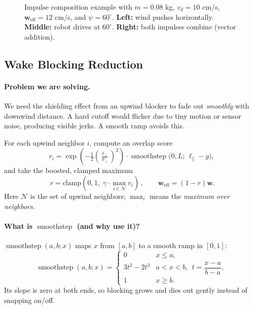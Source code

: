 \documentclass[11pt,a4paper]{article}
\DeclareMathOperator{\smoothstep}{smoothstep}
\newcommand{\vect}[1]{\mathbf{#1}}
\begin{document}
\begin{figure}[H]
  \caption{Impulse composition example with $m=0.08$ kg, $v_d=10$ cm/s, $\vect{w}_\text{eff}=12$ cm/s, and $\psi=60^\circ$.
  \textbf{Left:} wind pushes horizontally. \textbf{Middle:} robot drives at $60^\circ$. \textbf{Right:} both impulses combine (vector addition).}
\end{figure}

\subsection{Wake Blocking Reduction}
\label{sec:wake-blocking}

\paragraph{Problem we are solving.}
We need the shielding effect from an upwind blocker to fade out \emph{smoothly} with downwind distance. A hard cutoff would flicker
due to tiny motion or sensor noise, producing visible jerks. A smooth ramp avoids this.

For each upwind neighbor \(i\), compute an overlap score
\begin{equation}
  r_i = \exp\!\left(-\tfrac{1}{2}\left(\tfrac{\ell_\perp}{\sigma_\perp}\right)^2\right)
        \cdot \smoothstep\!\bigl(0, L;\, \ell_\parallel - g \bigr),
  \label{eq:ri}
\end{equation}
and take the boosted, clamped maximum
\[
  \boxed{\,r = \mathrm{clamp}\!\left(0,1,\;\gamma\cdot\max_{i\in\mathcal{N}} r_i\right)\,},\qquad
  \vect{w}_\text{eff}=(1-r)\vect{w}.
\]
Here \(\mathcal{N}\) is the set of upwind neighbors; \(\max_i\) means the \emph{maximum over neighbors}.

\paragraph{What is \(\smoothstep{}\) (and why use it)?}
\(\smoothstep(a,b;x)\) maps \(x\) from \([a,b]\) to a smooth ramp in \([0,1]\):
\[
\smoothstep(a,b;x)=
\begin{cases}
0 & x\le a,\\[2pt]
3t^2-2t^3 & a<x<b,\ \ t=\dfrac{x-a}{b-a},\\[6pt]
1 & x\ge b.
\end{cases}
\]
Its slope is zero at both ends, so blocking grows and dies out gently instead of snapping on/off.
\end{document}
